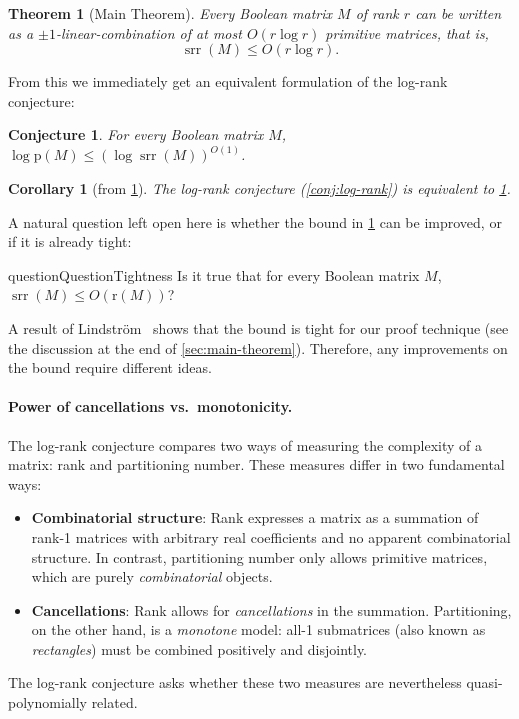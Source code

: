 \documentclass[11pt]{article}
\theoremstyle{plain}
\newtheorem{theorem}[thm]{Theorem}
\newtheorem{conjecture}[thm]{Conjecture}
\newtheorem{corollary}[thm]{Corollary}
\theoremstyle{remark}
\def\r{{\mathrm{r}}}
\def\p{{\mathrm{p}}}
\DeclareMathOperator{\ur}{srr}
\begin{document}
\begin{theorem}[Main Theorem]\label{thm:main}
	Every Boolean matrix $M$ of rank $r$ can be written as a $\pm 1$-linear-combination of at most $O(r \log r)$ primitive matrices, that is,
	\[\ur(M) \leq O(r \log r).\]
\end{theorem}

From this we immediately get an equivalent formulation of the log-rank conjecture:
\begin{conjecture}
	\label{conj:unary_vs_rank}
	For every Boolean matrix $M$, $\log \p(M) \leq (\log \ur(M))^{O(1)}$.
\end{conjecture}
\begin{corollary}[from \cref{thm:main}] \label{corollary: main}
	The log-rank conjecture (\cref{conj:log-rank}) is equivalent to \cref{conj:unary_vs_rank}.
\end{corollary}

A natural question left open here is whether the bound in \cref{thm:main} can be improved, or if it is already tight:

\begin{restatable}{question}{QuestionTightness} \label{question: tightness}
	Is it true that for every Boolean matrix $M$, $\ur(M) \leq O(\r(M))$?
\end{restatable}

A result of Lindström~\cite{LinCombinatorial1965}  shows that the bound is tight for our proof technique (see the discussion at the end of \cref{sec:main-theorem}). Therefore, any improvements on the bound require different ideas. 

\paragraph*{Power of cancellations vs.~monotonicity.} The log-rank conjecture compares two ways of measuring the complexity of a matrix: rank and partitioning number. These measures differ in two fundamental ways:

\begin{itemize}
	\item \textbf{Combinatorial structure}: Rank expresses a matrix as a summation of rank-1 matrices with arbitrary real coefficients and no apparent combinatorial structure. In contrast, partitioning number only allows primitive matrices, which are purely \emph{combinatorial} objects.
	\item \textbf{Cancellations}: Rank allows for \emph{cancellations} in the summation. Partitioning, on the other hand,  is a \emph{monotone} model: all-1 submatrices (also known as \emph{rectangles}) must be combined positively and disjointly.
\end{itemize}
The log-rank conjecture asks whether these two measures are nevertheless quasi-polynomially related.
\end{document}
